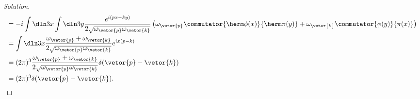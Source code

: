 \begin{proof}[Solution]
\begin{align*}
                                                       &= -i\int \dln3x \int \dln3y \frac{e^{i(px - ky)}}{2\sqrt{\omega_{\vetor{p}} \omega_{\vetor{k}}}} \left(\omega_{\vetor{p}}\commutator{\herm\phi(x)}{\herm\pi(y)} + \omega_{\vetor{k}} \commutator{\phi(y)}{\pi(x)}\right)\\
                                                       &= \int \dln3x \frac{\omega_{\vetor{p}} + \omega_{\vetor{k}}}{2 \sqrt{\omega_{\vetor{p}} \omega_{\vetor{k}}}} e^{i x (p - k)}\\
                                                       &= (2\pi)^3 \frac{\omega_{\vetor{p}} + \omega_{\vetor{k}}}{2\sqrt{\omega_{\vetor{p}} \omega_{\vetor{k}}}} \delta(\vetor{p} - \vetor{k})\\
                                                       &= (2\pi)^3 \delta(\vetor{p} - \vetor{k}).
   \end{align*}


\end{proof}
